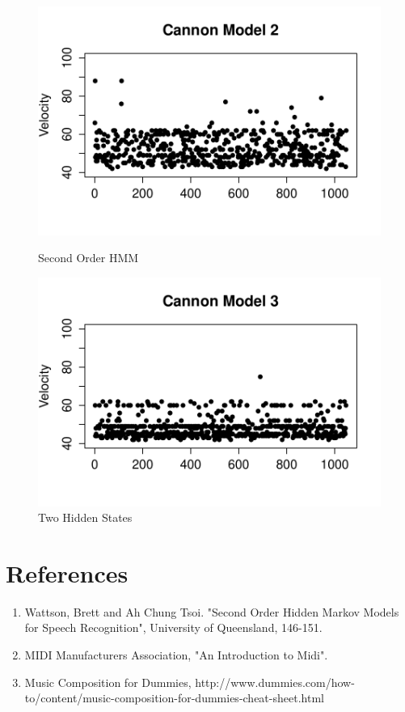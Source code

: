\documentclass{article} %
\begin{document}
\begin{figure}[ht]
\begin{minipage}[b]{0.5\linewidth}
    \includegraphics[scale = 0.45]{CannonModel2Velocity.pdf} 
    \caption{Second Order HMM} 
    \vspace{4ex}
  \end{minipage}%
  \begin{minipage}[b]{0.5\linewidth}
    \centering
    \includegraphics[scale = 0.45]{CannonModel3Velocity.pdf} 
    \caption{Two Hidden States} 
    \vspace{4ex}
  \end{minipage} 
\end{figure}

\newpage

\section{References}
\begin{enumerate}
\item Wattson, Brett and Ah Chung Tsoi. "Second Order Hidden Markov Models for Speech Recognition", University of Queensland, 146-151. 
\item MIDI Manufacturers Association, "An Introduction to Midi". 
\item Music Composition for Dummies, http://www.dummies.com/how-to/content/music-composition-for-dummies-cheat-sheet.html
\end{enumerate}
\end{document}
